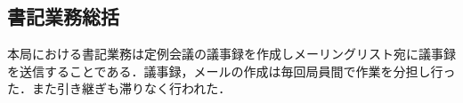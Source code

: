 \subsection*{書記業務総括}

本局における書記業務は定例会議の議事録を作成しメーリングリスト宛に議事録を送信することである．議事録，メールの作成は毎回局員間で作業を分担し行った．また引き継ぎも滞りなく行われた．
